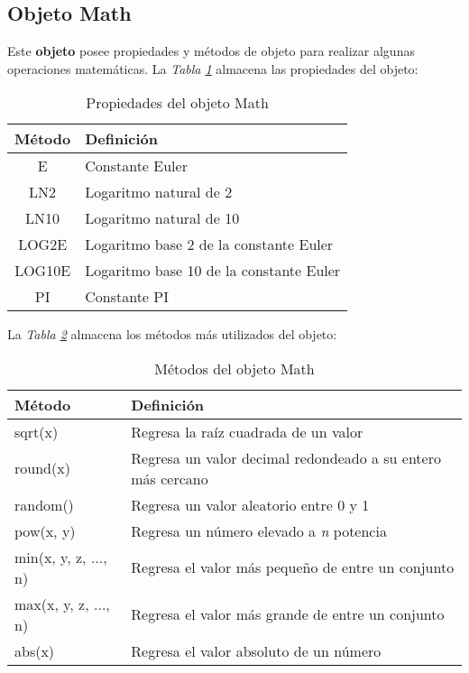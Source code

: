 \subsection{Objeto Math}
\hspace{0.55cm}Este \textbf{objeto} posee propiedades y métodos de objeto para realizar algunas operaciones matemáticas. La \textit{Tabla \ref{tab: 6}} almacena las propiedades del objeto:
\begin{table}[H]
    \begin{center}
        \caption{Propiedades del objeto Math}
        \label{tab: 6}
        \begin{tabular}{c l}
            \hline
            \textbf{Método}&\textbf{Definición} \\
            \hline
            E & Constante Euler \\
            LN2 & Logaritmo natural de 2 \\
            LN10 & Logaritmo natural de 10 \\
            LOG2E & Logaritmo base 2 de la constante Euler \\
            LOG10E & Logaritmo base 10 de la constante Euler \\
            PI & Constante PI \\
            \hline
        \end{tabular}
    \end{center}
\end{table}

La \textit{Tabla \ref{tab: 7}} almacena los métodos más utilizados del objeto:

\begin{table}[H]
    \begin{center}
        \caption{Métodos del objeto Math}
        \label{tab: 7}
        \begin{tabular}{m{4cm} m{9cm}}
            \hline
            \textbf{Método}&\textbf{Definición} \\
            \hline
            sqrt(x) & Regresa la raíz cuadrada de un valor \\
            round(x) & Regresa un valor decimal redondeado a su entero más cercano \\
            random() & Regresa un valor aleatorio entre 0 y 1 \\
            pow(x, y) & Regresa un número elevado a \textit{n} potencia \\
            min(x, y, z, ..., n) & Regresa el valor más pequeño de entre un conjunto \\
            max(x, y, z, ..., n) & Regresa el valor más grande de entre un conjunto \\
            abs(x) & Regresa el valor absoluto de un número \\
            \hline
        \end{tabular}
    \end{center}
\end{table}


